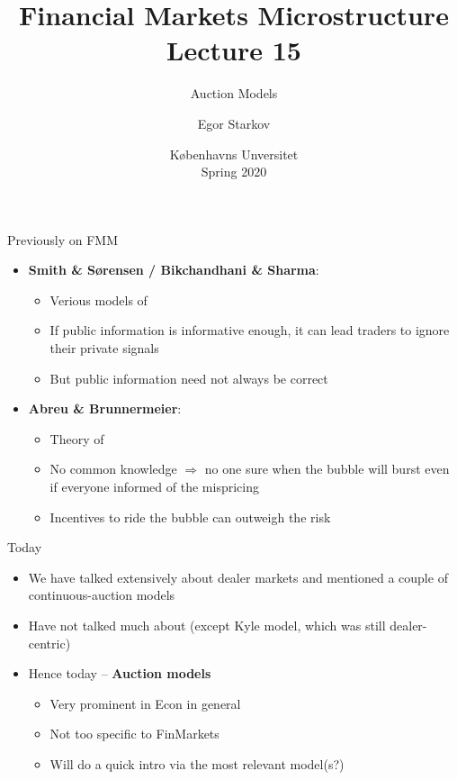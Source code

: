 \documentclass[english,10pt
,aspectratio=169
]{beamer}
\title{Financial Markets Microstructure \\ Lecture 15}
\subtitle{Auction Models}
\author{Egor Starkov}
\date{K{\o}benhavns Unversitet \\
	Spring 2020}
\begin{document}
	\frame[plain]{\titlepage}



\begin{frame}{Previously on FMM}
	\begin{itemize}
		\item \textbf{Smith \& S{\o}rensen / Bikchandhani \& Sharma}:
		\begin{itemize}
			\item Verious models of 
			\item If public information is informative enough, it can lead traders to ignore their private signals
			\item But public information need not always be correct
		\end{itemize}
		\item \textbf{Abreu \& Brunnermeier}:
		\begin{itemize}
			\item Theory of 
			\item No common knowledge $\Rightarrow$ no one sure when the bubble will burst even if everyone informed of the mispricing
			\item Incentives to ride the bubble can outweigh the risk
		\end{itemize}
	\end{itemize}
\end{frame}	


\begin{frame}{Today}
	\begin{itemize}
		\item We have talked extensively about \alert{dealer markets} and mentioned a couple of \alert{continuous-auction} models
		\item Have not talked much about  (except Kyle model, which was still dealer-centric)
		\item Hence today -- \textbf{Auction models}
		\begin{itemize}
			\item Very prominent in Econ in general
			\item Not too specific to FinMarkets
			\item Will do a quick intro via the most relevant model(s?)
		\end{itemize}
	\end{itemize}
\end{frame}
\end{document}
